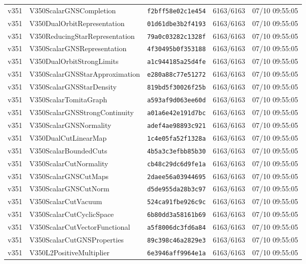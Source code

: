 \documentclass[11pt]{article}
\theoremstyle{definition}\newtheorem{deriv}{Derivação}
\begin{document}
{\begin{longtable}{@{}lllll@{}}
v351 & V350ScalarGNSCompletion & \texttt{f2bff58e02c1e454} & 6163/6163 & 07/10 09:55:05 \\
v351 & V350DualOrbitRepresentation & \texttt{01d61dbe3b2f4193} & 6163/6163 & 07/10 09:55:05 \\
v351 & V350ReducingStarRepresentation & \texttt{79a0c03282c1328f} & 6163/6163 & 07/10 09:55:05 \\
v351 & V350ScalarGNSRepresentation & \texttt{4f30495b0f353188} & 6163/6163 & 07/10 09:55:05 \\
v351 & V350DualOrbitStrongLimits & \texttt{a1c944185a25d4fe} & 6163/6163 & 07/10 09:55:05 \\
v351 & V350ScalarGNSStarApproximation & \texttt{e280a88c77e51272} & 6163/6163 & 07/10 09:55:05 \\
v351 & V350ScalarGNSStarDensity & \texttt{819bd5f30026f25b} & 6163/6163 & 07/10 09:55:05 \\
v351 & V350ScalarTomitaGraph & \texttt{a593af9d063ee60d} & 6163/6163 & 07/10 09:55:05 \\
v351 & V350ScalarGNSStrongContinuity & \texttt{a01a6e42e191d7bc} & 6163/6163 & 07/10 09:55:05 \\
v351 & V350ScalarGNSNormality & \texttt{adef4ae98893c921} & 6163/6163 & 07/10 09:55:05 \\
v351 & V350DualCutLinearMap & \texttt{1c4e05fa52f1328a} & 6163/6163 & 07/10 09:55:05 \\
v351 & V350ScalarBoundedCuts & \texttt{4b5a3c3efbb85b30} & 6163/6163 & 07/10 09:55:05 \\
v351 & V350ScalarCutNormality & \texttt{cb48c29dc6d9fe1a} & 6163/6163 & 07/10 09:55:05 \\
v351 & V350ScalarGNSCutMaps & \texttt{2daee56a03944695} & 6163/6163 & 07/10 09:55:05 \\
v351 & V350ScalarGNSCutNorm & \texttt{d5de955da28b3c97} & 6163/6163 & 07/10 09:55:05 \\
v351 & V350ScalarCutVacuum & \texttt{524ca91fbe926c9c} & 6163/6163 & 07/10 09:55:05 \\
v351 & V350ScalarCutCyclicSpace & \texttt{6b80dd3a58161b69} & 6163/6163 & 07/10 09:55:05 \\
v351 & V350ScalarCutVectorFunctional & \texttt{a5f8006dc3fd6a84} & 6163/6163 & 07/10 09:55:05 \\
v351 & V350ScalarCutGNSProperties & \texttt{89c398c46a2829e3} & 6163/6163 & 07/10 09:55:05 \\
v351 & V350L2PositiveMultiplier & \texttt{6e3946aff9964e1a} & 6163/6163 & 07/10 09:55:05 \\

\end{longtable}}
\end{document}
